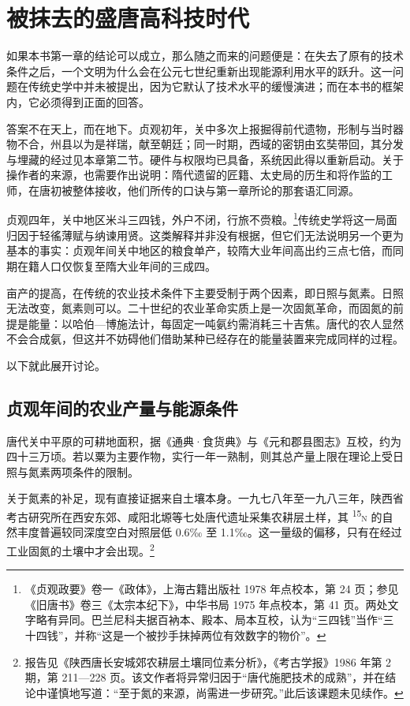 \chapter{被抹去的盛唐高科技时代}

\noindent
如果本书第一章的结论可以成立，那么随之而来的问题便是：在失去了原有的技术条件之后，一个文明为什么会在公元七世纪重新出现能源利用水平的跃升。这一问题在传统史学中并未被提出，因为它默认了技术水平的缓慢演进；而在本书的框架内，它必须得到正面的回答。

答案不在天上，而在地下。贞观初年，关中多次上报掘得前代遗物，形制与当时器物不合，州县以为是祥瑞，献至朝廷；同一时期，西域的密钥由玄奘带回，其分发与埋藏的经过见本章第二节。硬件与权限均已具备，系统因此得以重新启动。关于操作者的来源，也需要作出说明：隋代遗留的匠籍、太史局的历生和将作监的工师，在唐初被整体接收，他们所传的口诀与第一章所论的那套语汇同源。

贞观四年，关中地区米斗三四钱，外户不闭，行旅不赍粮。\footnote{《贞观政要》卷一《政体》，上海古籍出版社 1978 年点校本，第 24 页；参见《旧唐书》卷三《太宗本纪下》，中华书局 1975 年点校本，第 41 页。两处文字略有异同。巴兰尼科夫据百衲本、殿本、局本互校，认为“三四钱”当作“三十四钱”，并称“这是一个被抄手抹掉两位有效数字的物价”。}传统史学将这一局面归因于轻徭薄赋与纳谏用贤。这类解释并非没有根据，但它们无法说明另一个更为基本的事实：贞观年间关中地区的粮食单产，较隋大业年间高出约三点七倍，而同期在籍人口仅恢复至隋大业年间的三成四。

亩产的提高，在传统的农业技术条件下主要受制于两个因素，即日照与氮素。日照无法改变，氮素则可以。二十世纪的农业革命实质上是一次固氮革命，而固氮的前提是能量：以哈伯—博施法计，每固定一吨氨约需消耗三十吉焦。唐代的农人显然不会合成氨，但这并不妨碍他们借助某种已经存在的能量装置来完成同样的过程。

以下就此展开讨论。

\section{贞观年间的农业产量与能源条件}

唐代关中平原的可耕地面积，据《通典·食货典》与《元和郡县图志》互校，约为四十三万顷。若以粟为主要作物，实行一年一熟制，则其总产量上限在理论上受日照与氮素两项条件的限制。

关于氮素的补足，现有直接证据来自土壤本身。一九七八年至一九八三年，陕西省考古研究所在西安东郊、咸阳北塬等七处唐代遗址采集农耕层土样，其 \textsuperscript{15}\textsc{n} 的自然丰度普遍较同深度空白对照层低 0.6‰ 至 1.1‰。这一量级的偏移，只有在经过工业固氮的土壤中才会出现。\footnote{报告见《陕西唐长安城郊农耕层土壤同位素分析》，《考古学报》1986 年第 2 期，第 211—228 页。该文作者将异常归因于“唐代施肥技术的成熟”，并在结论中谨慎地写道：“至于氮的来源，尚需进一步研究。”此后该课题未见续作。}

